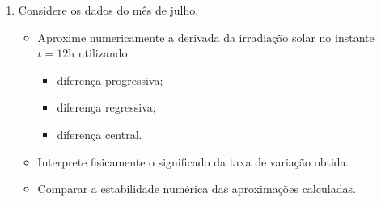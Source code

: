 \begin{enumerate}[label=\thesection.\arabic*]

\item Considere os dados do mês de julho.
\begin{itemize}
    \item Aproxime numericamente a derivada da irradiação solar no instante \(t=12\mathrm{h}\) utilizando:
        \begin{itemize}
        \item diferença progressiva;
        \item diferença regressiva;
        \item diferença central.
        \end{itemize}

    \item Interprete fisicamente o significado da taxa de variação obtida.

    \item Comparar a estabilidade numérica das aproximações calculadas.

    \end{itemize}





\end{enumerate}
